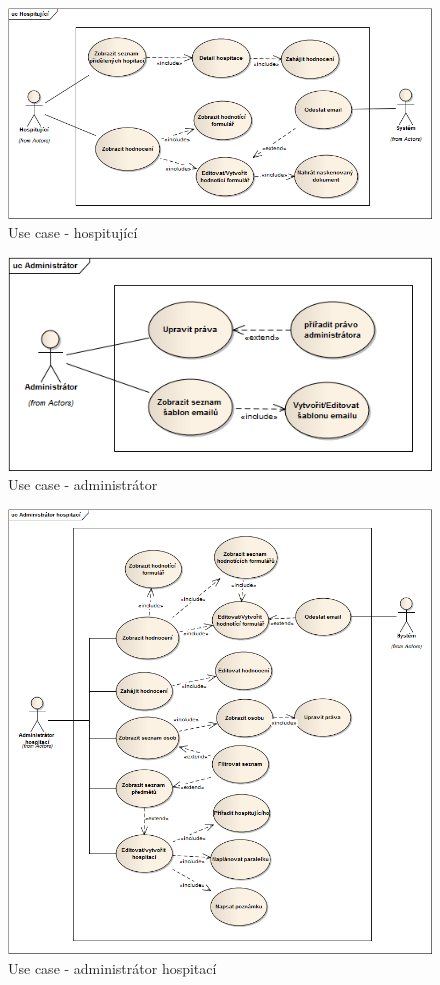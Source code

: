 \begin{figure}[h]
\begin{center}
\includegraphics[width=12cm]{figures/actor_observer}
\caption{Use case - hospitující}
\label{fig:actor_observer}
\end{center}
\end{figure}

\begin{figure}[h]
\begin{center}
\includegraphics[width=12cm]{figures/actor_root}
\caption{Use case - administrátor}
\label{fig:actor_root}
\end{center}
\end{figure}

\begin{figure}[h]
\begin{center}
\includegraphics[width=14cm]{figures/actor_admin}
\caption{Use case - administrátor hospitací}
\label{fig:actor_admin}
\end{center}
\end{figure}

